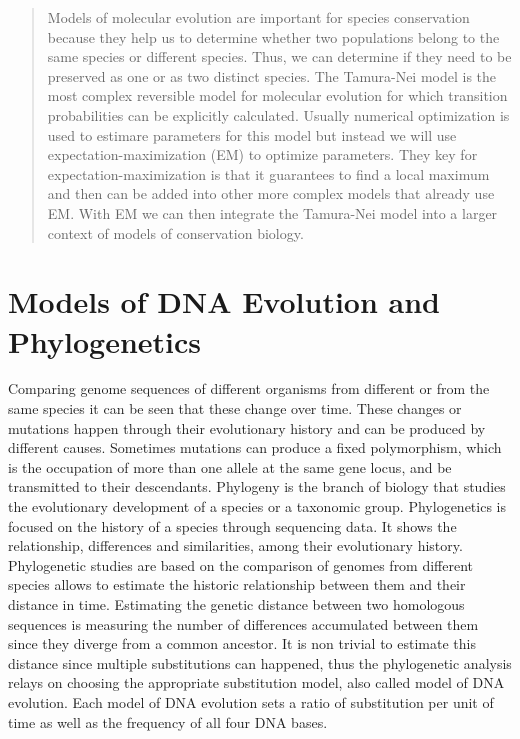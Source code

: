 \documentclass[12pt,twoside]{article}
\begin{document}
\begin{abstract}
Models of molecular evolution are important for species conservation because they help us to determine whether two populations belong to the same species or different species. Thus, we can determine if they need to be preserved as one or as two distinct species.
The Tamura-Nei model is the most complex reversible model for molecular evolution for which transition probabilities can be explicitly calculated. Usually numerical optimization is used to estimare parameters for this model but instead we will use expectation-maximization (EM) to optimize parameters. They key for expectation-maximization is that it guarantees to find a local maximum and then can be added into other more complex models that already use EM. With EM we can then integrate the Tamura-Nei model into a larger context of models of conservation biology.
\end{abstract}

\section{Models of DNA Evolution and Phylogenetics}
Comparing genome sequences of different organisms from different or from the same species it can be seen that these change over time. These changes or mutations happen through their evolutionary history and can be produced by different causes. Sometimes mutations can produce a fixed polymorphism, which is the occupation of more than one allele at the same gene locus, and be transmitted to their descendants. 
Phylogeny is the branch of biology that studies the evolutionary development of a species or a taxonomic group. Phylogenetics is focused on the history of a species through sequencing data. It shows the relationship, differences and similarities, among their evolutionary history. Phylogenetic studies are based on the comparison of genomes from different species allows to estimate the historic relationship between them and their distance in time.
Estimating the genetic distance between two homologous sequences is measuring the number of differences accumulated between them since they diverge from a common ancestor. It is non trivial to estimate this distance since multiple substitutions can happened, thus the phylogenetic analysis relays on choosing the appropriate substitution model, also called model of DNA evolution. Each model of DNA evolution sets a ratio of substitution per unit of time as well as the frequency of all four DNA bases. 
\end{document}
